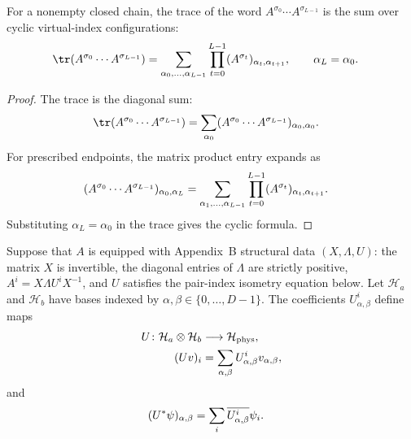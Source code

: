 \begin{lemma}\label{thm:trace_eval_word_eq_sum_cyclic}
    \leanok
    For a nonempty closed chain, the trace of the word
    $A^{\sigma_0}\cdots A^{\sigma_{L-1}}$ is the sum over cyclic virtual-index
    configurations:
    \begin{align}
        \tr(A^{\sigma_0}\cdots A^{\sigma_{L-1}})
         & =
        \sum_{\alpha_0,\ldots,\alpha_{L-1}}
        \prod_{t=0}^{L-1}
        (A^{\sigma_t})_{\alpha_t,\alpha_{t+1}},
        \qquad \alpha_L=\alpha_0.
        \notag
    \end{align}
\end{lemma}

\begin{proof}
    \leanok
    The trace is the diagonal sum:
    \begin{align}
        \tr(A^{\sigma_0}\cdots A^{\sigma_{L-1}})
         & =
        \sum_{\alpha_0}
        (A^{\sigma_0}\cdots A^{\sigma_{L-1}})_{\alpha_0,\alpha_0}.
        \notag
    \end{align}
    For prescribed endpoints, the matrix product entry expands as
    \begin{align}
        (A^{\sigma_0}\cdots A^{\sigma_{L-1}})_{\alpha_0,\alpha_L}
         & =
        \sum_{\alpha_1,\ldots,\alpha_{L-1}}
        \prod_{t=0}^{L-1}
        (A^{\sigma_t})_{\alpha_t,\alpha_{t+1}}.
        \notag
    \end{align}
    Substituting $\alpha_L=\alpha_0$ in the trace gives the cyclic formula.
\end{proof}

\begin{definition}
    \label{def:appendixB_physical_isometry}
    \leanok
    Suppose that $A$ is equipped with Appendix~B structural data
    $(X,\Lambda,U)$: the matrix $X$ is invertible, the diagonal entries of
    $\Lambda$ are strictly positive, $A^i=X\Lambda U^iX^{-1}$, and $U$
    satisfies the pair-index isometry equation below. Let $\mathcal H_a$ and
    $\mathcal H_b$ have bases indexed by
    $\alpha,\beta\in\{0,\ldots,D-1\}$. The coefficients
    $U^i_{\alpha,\beta}$ define maps
    \begin{align}
        U\colon \mathcal H_a\otimes\mathcal H_b
         & \longrightarrow \mathcal H_{\mathrm{phys}},
        \notag                                         \\
        (Uv)_i
         & =
        \sum_{\alpha,\beta}
        U^i_{\alpha,\beta}v_{\alpha,\beta},
        \notag
    \end{align}
    and
    \begin{align}
        (U^*\psi)_{\alpha,\beta}
         & =
        \sum_i\overline{U^i_{\alpha,\beta}} \psi_i.
        \notag
    \end{align}
\end{definition}

